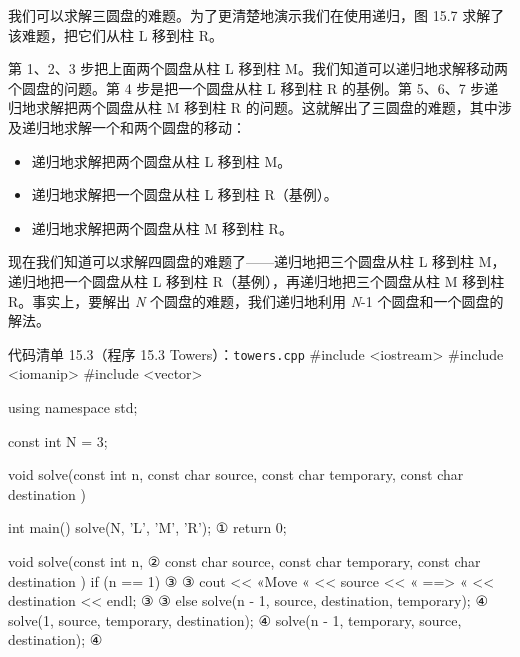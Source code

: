 我们可以求解三圆盘的难题。为了更清楚地演示我们在使用递归，图 15.7 求解了该难题，把它们从柱 L 移到柱 R。


第 1、2、3 步把上面两个圆盘从柱 L 移到柱 M。我们知道可以递归地求解移动两个圆盘的问题。第 4 步是把一个圆盘从柱 L 移到柱 R 的基例。第 5、6、7 步递归地求解把两个圆盘从柱 M 移到柱 R 的问题。这就解出了三圆盘的难题，其中涉及递归地求解一个和两个圆盘的移动：

\begin{itemize}
\item 递归地求解把两个圆盘从柱 L 移到柱 M。
\item 递归地求解把一个圆盘从柱 L 移到柱 R（基例）。
\item 递归地求解把两个圆盘从柱 M 移到柱 R。
\end{itemize}

现在我们知道可以求解四圆盘的难题了——递归地把三个圆盘从柱 L 移到柱 M，递归地把一个圆盘从柱 L 移到柱 R（基例），再递归地把三个圆盘从柱 M 移到柱 R。事实上，要解出 \emph{N} 个圆盘的难题，我们递归地利用 \emph{N}-1 个圆盘和一个圆盘的解法。

\begin{codeboxt}{代码清单 15.3（程序 15.3 Towers）：\texttt{towers.\allowbreak{}cpp}}
#include <iostream>
#include <iomanip>
#include <vector>

using namespace std;

const int N = 3;

void solve(const int  n,
           const char source, 
           const char temporary,
           const char destination )

int main()
{
    solve(N, 'L', 'M', 'R');                                         ①
    return 0;
}

void solve(const int  n,                                             ②
           const char source, 
           const char temporary,
           const char destination )
{
    if (n == 1)                                                      ③
    {                                                                ③
        cout << «Move « << source << « ==> « << destination << endl; ③
    }                                                                ③
    else
    {
        solve(n - 1, source,    destination, temporary);             ④
        solve(1,     source,    temporary,   destination);           ④
        solve(n - 1, temporary, source,      destination);           ④
    }
}
\end{codeboxt}
\par
{}\par
{}\par
{}\par

